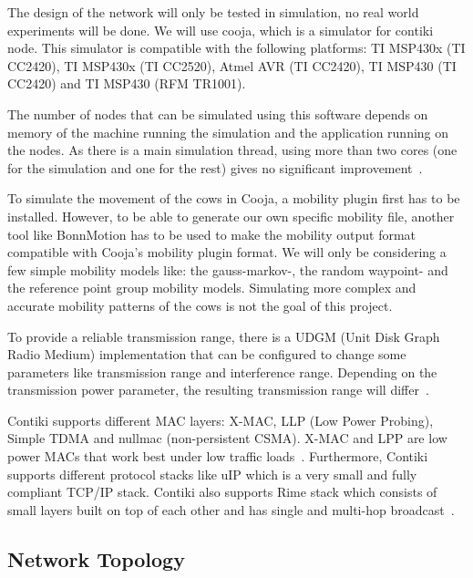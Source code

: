 \documentclass[conference]{IEEEtran}
\begin{document}
The design of the network will only be tested in simulation, no real world
experiments will be done. We will use cooja, which is a simulator for contiki
node. This simulator is compatible with the following platforms: TI MSP430x (TI
CC2420), TI MSP430x (TI CC2520), Atmel AVR (TI CC2420), TI MSP430 (TI CC2420)
and TI MSP430 (RFM TR1001).

The number of nodes that can be simulated using this software depends on memory
of the machine running the simulation and the application running on the nodes.
As there is a main simulation thread, using more than two cores (one for the
simulation and one for the rest) gives no significant
improvement~\cite{contikidev}.

To simulate the movement of the cows in Cooja, a mobility plugin first has to
be installed. However, to be able to generate our own specific mobility file,
another tool like BonnMotion has to be used to make the mobility output format
compatible with Cooja's mobility plugin format. We will only be considering
a few simple mobility models like: the gauss-markov-, the random waypoint- and
the reference point group mobility models. Simulating more complex and accurate
mobility patterns of the cows is not the goal of this project.

To provide a reliable transmission range, there is a UDGM (Unit Disk Graph
Radio Medium) implementation that can be configured to change some parameters
like transmission range and interference range. Depending on the transmission
power parameter, the resulting transmission range will
differ~\cite{contikidev}.

Contiki supports different MAC layers: X-MAC, LLP (Low Power Probing), Simple
TDMA and nullmac (non-persistent CSMA).  X-MAC and LPP are low power MACs that
work best under low traffic loads~\cite{coojacrash}.  Furthermore, Contiki
supports different protocol stacks like uIP which is a very small and fully
compliant TCP/IP stack. Contiki also supports Rime stack which consists of
small layers built on top of each other and has single and multi-hop
broadcast~\cite{coojacrash}.
\subsection{Network Topology}
\end{document}
